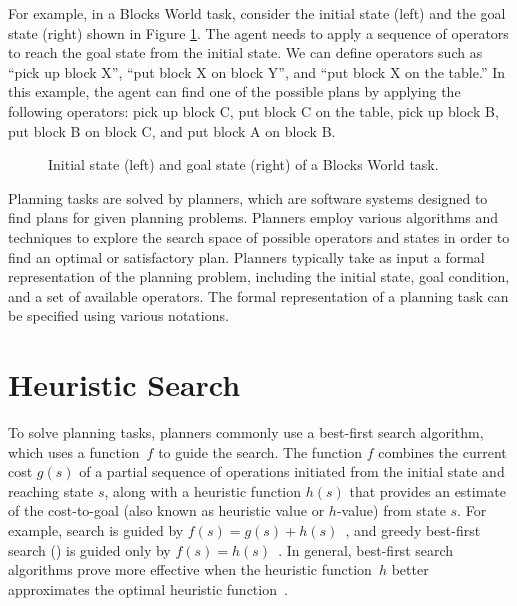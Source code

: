 \documentclass[ppgc,diss,english]{iiufrgs}
\begin{document}
For example, in a Blocks World task, consider the initial state (left) and the goal state (right) shown in Figure \ref{fig:intro-blocks}. The agent needs to apply a sequence of operators to reach the goal state from the initial state. We can define operators such as ``pick up block X'', ``put block X on block Y'', and ``put block X on the table.'' In this example, the agent can find one of the possible plans by applying the following operators: pick up block C, put block C on the table, pick up block B, put block B on block C, and put block A on block B.

\begin{figure}[ht]
\captionsetup{skip=5pt} %
\caption{Initial state (left) and goal state (right) of a Blocks World task.}
\centering
{}
\label{fig:intro-blocks}
\end{figure}

Planning tasks are solved by planners, which are software systems designed to find plans for given planning problems. Planners employ various algorithms and techniques to explore the search space of possible operators and states in order to find an optimal or satisfactory plan. Planners typically take as input a formal representation of the planning problem, including the initial state, goal condition, and a set of available operators. The formal representation of a planning task can be specified using various notations.

\section{Heuristic Search}
To solve planning tasks, planners commonly use a best-first search algorithm, which uses a function~$f$ to guide the search. The function $f$ combines the current cost $g(s)$ of a partial sequence of operations initiated from the initial state and reaching state $s$, along with a heuristic function $h(s)$ that provides an estimate of the cost-to-goal (also known as heuristic value or $h$-value) from state $s$. For example, \astar search is guided by $f(s)=g(s)+h(s)$~\cite{hart-et-al-ieeessc1968}, and greedy best-first search (\gbfs) is guided only by $f(s)=h(s)$~\cite{doran-michie-rsl1966}. In general, best-first search algorithms prove more effective when the heuristic function~$h$ better approximates the optimal heuristic function~\hstar.
\end{document}
